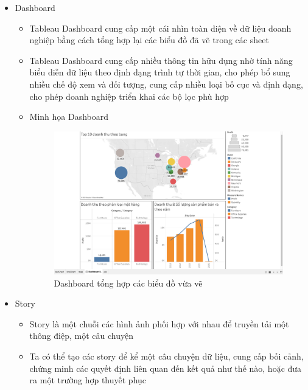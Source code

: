 \documentclass[a4paper, 12pt]{article}
\begin{document}
\begin{itemize}
    \item Dashboard 
    \begin{itemize}
        \item Tableau Dashboard cung cấp một cái nhìn toàn diện về dữ liệu doanh nghiệp bằng cách tổng hợp lại các biểu đồ đã vẽ trong các sheet
        \item Tableau Dashboard cung cấp nhiều thông tin hữu dụng nhờ tính năng biểu diễn dữ liệu theo định dạng trình tự thời gian, cho phép bổ sung nhiều chế độ xem và đối tượng, cung cấp nhiều loại bố cục và định dạng, cho phép doanh nghiệp triển khai các bộ lọc phù hợp
        \item Minh họa Dashboard
        \begin{figure}[H]
            \begin{center}
                \includegraphics[scale=0.3]{img/dashboard.png}
                \caption{Dashboard tổng hợp các biểu đồ vừa vẽ}
            \end{center}
        \end{figure}
    \end{itemize}

    \item Story
    \begin{itemize}
        \item Story là một chuỗi các hình ảnh phối hợp với nhau để truyền tải một thông điệp, một câu chuyện
        \item Ta có thể tạo các story để kể một câu chuyện dữ liệu, cung cấp bối cảnh, chứng minh các quyết định liên quan đến kết quả như thế nào, hoặc đưa ra một trường hợp thuyết phục
    \end{itemize}
\end{itemize}
\end{document}
